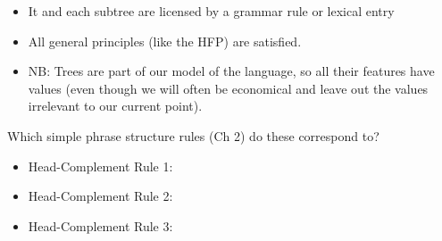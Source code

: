 \documentclass[a4paper,landscape,headrule,footrule]{foils}
\begin{document}
\begin{itemize}
\item It and each subtree are licensed by a grammar rule
or lexical entry
\item All general principles (like the HFP) are satisfied.
\item NB: Trees are part of our model of the language,
so all their features have values (even though we
will often be economical and leave out the values
irrelevant to our current point).
\end{itemize}



Which simple phrase structure rules (Ch 2) do these correspond to?

\begin{itemize}
\item  Head-Complement Rule 1:

\item  Head-Complement Rule 2:

\end{itemize}

\begin{itemize}
\item  Head-Complement Rule 3:

\end{itemize}
\end{document}
